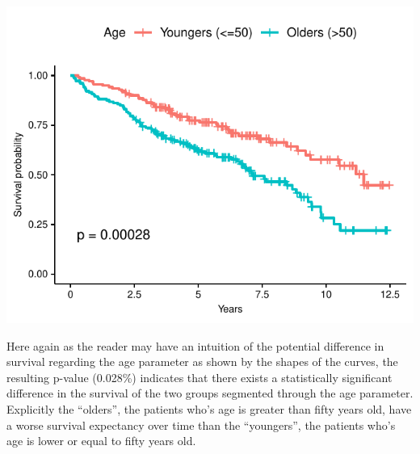 \documentclass[]{article}
\newenvironment{Shaded}{\begin{snugshade}}{\end{snugshade}}
\newcommand{\KeywordTok}[1]{\textcolor[rgb]{0.13,0.29,0.53}{\textbf{#1}}}
\newcommand{\DataTypeTok}[1]{\textcolor[rgb]{0.13,0.29,0.53}{#1}}
\newcommand{\DecValTok}[1]{\textcolor[rgb]{0.00,0.00,0.81}{#1}}
\newcommand{\StringTok}[1]{\textcolor[rgb]{0.31,0.60,0.02}{#1}}
\newcommand{\CommentTok}[1]{\textcolor[rgb]{0.56,0.35,0.01}{\textit{#1}}}
\newcommand{\OperatorTok}[1]{\textcolor[rgb]{0.81,0.36,0.00}{\textbf{#1}}}
\newcommand{\NormalTok}[1]{#1}
\begin{document}
\begin{Shaded}
\end{Shaded}

\includegraphics{survival_pbc_files/figure-latex/unnamed-chunk-19-1.pdf}

Here again as the reader may have an intuition of the potential
difference in survival regarding the age parameter as shown by the
shapes of the curves, the resulting p-value (0.028\%) indicates that
there exists a statistically significant difference in the survival of
the two groups segmented through the age parameter. Explicitly the
``olders'', the patients who's age is greater than fifty years old, have
a worse survival expectancy over time than the ``youngers'', the
patients who's age is lower or equal to fifty years old.
\end{document}
